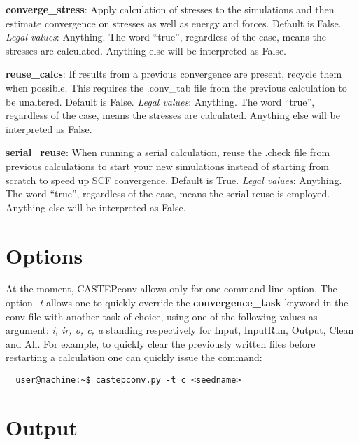 \documentclass[10pt]{article}
\begin{document}
\textbf{converge\_stress}: Apply calculation of stresses to the simulations and 
then estimate convergence on stresses as well as energy and forces. Default is 
False.\newline
\textit{Legal values}: Anything. The word ``true'', regardless of the case, 
means the stresses are calculated. Anything else will be interpreted as 
False.\newline

\textbf{reuse\_calcs}: If results from a previous convergence are present, 
recycle them when possible. This requires the .conv\_tab file from the previous 
calculation to be unaltered. Default is False.\newline
\textit{Legal values}: Anything. The word ``true'', regardless of the case, 
means the stresses are calculated. Anything else will be interpreted as 
False.\newline

\textbf{serial\_reuse}: When running a serial calculation, reuse the .check file from previous calculations to start your new simulations instead of starting from scratch to speed up SCF convergence. Default is True.\newline
\textit{Legal values}: Anything. The word ``true'', regardless of the case, 
means the serial reuse is employed. Anything else will be interpreted as 
False.\newline

\section{Options}

At the moment, CASTEPconv allows only for one command-line option. The option \textit{-t} allows one to quickly override the \textbf{convergence\_task} keyword in the conv file with another task of choice, using one of the following values as argument: \textit{i, ir, o, c, a} standing respectively for Input, InputRun, Output, Clean and All. For example, to quickly clear the previously written files before restarting a calculation one can quickly issue the command:

\begin{lstlisting}
  user@machine:~$ castepconv.py -t c <seedname>
\end{lstlisting}

\section{Output}
\end{document}

